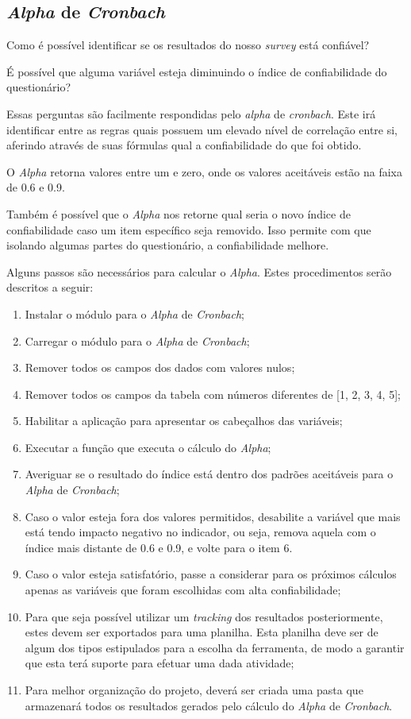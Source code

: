 \subsection{\textit{Alpha} de \textit{Cronbach}}
\label{sub:alpha_de_cronbach}
Como é possível identificar se os resultados do nosso \textit{survey} está confiável?

É possível que alguma variável esteja diminuindo o índice de confiabilidade do questionário?

Essas perguntas são facilmente respondidas pelo \textit{alpha} de \textit{cronbach}. Este irá identificar entre as regras quais possuem
um elevado nível de correlação entre si, aferindo através de suas fórmulas qual a confiabilidade do que foi obtido.

O \textit{Alpha} retorna valores entre um e zero, onde os valores aceitáveis estão na faixa de 0.6 e 0.9.

Também é possível que o \textit{Alpha} nos retorne qual seria o novo índice de confiabilidade caso um item específico seja removido.
Isso permite com que isolando algumas partes do questionário, a confiabilidade melhore.

Alguns passos são necessários para calcular o \textit{Alpha}. Estes procedimentos serão descritos a seguir:

\begin{enumerate}
    \item Instalar o módulo para o \textit{Alpha} de \textit{Cronbach};
    \item Carregar o módulo para o \textit{Alpha} de \textit{Cronbach};
    \item Remover todos os campos dos dados com valores nulos;
    \item Remover todos os campos da tabela com números diferentes de [1, 2, 3, 4, 5];
    \item Habilitar a aplicação para apresentar os cabeçalhos das variáveis;
    \item Executar a função que executa o cálculo do \textit{Alpha};
    \item Averiguar se o resultado do índice está dentro dos padrões aceitáveis para o \textit{Alpha} de \textit{Cronbach};
    \item Caso o valor esteja fora dos valores permitidos, desabilite a variável que mais está tendo impacto negativo no indicador,
        ou seja, remova aquela com o índice mais distante de 0.6 e 0.9, e volte para o item 6.
    \item Caso o valor esteja satisfatório, passe a considerar para os próximos cálculos apenas as variáveis que foram
        escolhidas com alta confiabilidade;
    \item Para que seja possível utilizar um \textit{tracking} dos resultados posteriormente, estes devem ser exportados para uma planilha.
        Esta planilha deve ser de algum dos tipos estipulados para a escolha da ferramenta, de modo a garantir que esta terá suporte
        para efetuar uma dada atividade;
    \item Para melhor organização do projeto, deverá ser criada uma pasta que armazenará todos os resultados gerados pelo cálculo do \textit{Alpha}
        de \textit{Cronbach}.
\end{enumerate}

